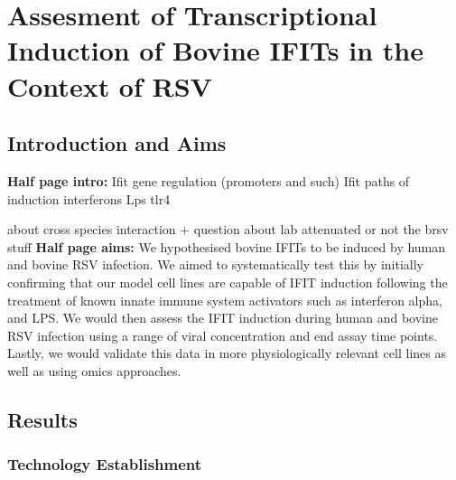 \chapter{Assesment of Transcriptional Induction of Bovine IFITs in the Context of RSV} \label{ch:Assesment of Transcriptional Induction of Bovine IFITs in the Context of RSV}
\section{Introduction and Aims} \label{sec:Introduction and Aims Chapter2}
\textbf{Half page intro:}
Ifit gene regulation (promoters and such) \newline
Ifit paths of induction \newline
interferons \newline
Lps tlr4 \newline

about cross species interaction + question about lab attenuated or not the brsv stuff
\textbf{Half page aims:}
We hypothesised  bovine IFITs to be induced by human and bovine RSV infection. We aimed to systematically test this by initially confirming that our model cell lines are capable of IFIT induction following the treatment of known innate immune system activators such as interferon alpha, and LPS. We would then assess the IFIT induction during human and bovine RSV infection using a range of viral concentration and end assay time points. Lastly, we would validate this data in more physiologically relevant cell lines as well as using omics approaches.

\section{Results} \label{sec:Results Chapter2}
\subsection{Technology Establishment} \label{subsec:Technology Establishment}

